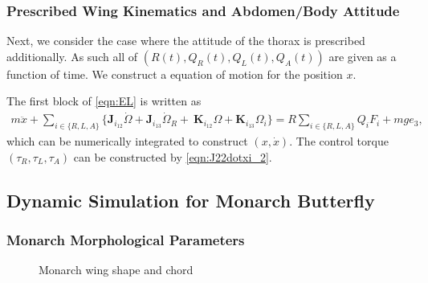 \documentclass[10pt]{article}
\begin{document}
\subsubsection{Prescribed Wing Kinematics and Abdomen/Body Attitude}

Next, we consider the case where the attitude of the thorax is prescribed additionally. 
As such all of $(R(t),Q_R(t),Q_L(t),Q_A(t))$ are given as a function of time.
We construct a equation of motion for the position $x$. 

The first block of \eqref{eqn:EL} is written as
\begin{align}
    m\ddot x + 
    \sum_{i\in\{R,L,A\}} \big\{ \mathbf{J}_{i_{12}} \dot\Omega + \mathbf{J}_{i_{13}}\dot\Omega_R 
    + \ \mathbf{K}_{i_{12}}\Omega + \mathbf{K}_{i_{13}}\Omega_i \big\} = R\sum_{i\in\{R,L,A\}} Q_i F_i + mg e_3,\label{eqn:mx_ddot}
\end{align}
which can be numerically integrated to construct $(x,\dot x)$. 
The control torque $(\tau_R,\tau_L,\tau_A)$ can be constructed by \eqref{eqn:J22dotxi_2}.

\subsection{Dynamic Simulation for Monarch Butterfly}

\subsubsection{Monarch Morphological Parameters}

\begin{figure}
    \centerline{
        \hfill
    }
    \caption{Monarch wing shape and chord}\label{fig:Monarch_wing}
\end{figure}
\end{document}
